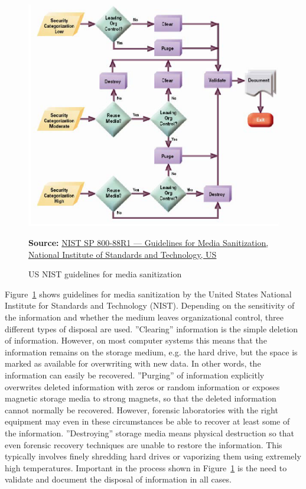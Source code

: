 \begin{figure}
\centering
\includegraphics[width=.75\textwidth]{screen1.png} \\ 

\vspace{\baselineskip}

\tiny \textbf{Source:} \href{https://nvlpubs.nist.gov/nistpubs/SpecialPublications/NIST.SP.800-88r1.pdf}{NIST SP 800-88R1 --- Guidelines for Media Sanitization, National Institute of Standards and Technology, US}
\caption{US NIST guidelines for media sanitization}
\label{fig:nist}
\end{figure}

Figure~\ref{fig:nist} shows guidelines for media sanitization by the United States National Institute for Standards and Technology (NIST). Depending on the sensitivity of the information and whether the medium leaves organizational control, three different types of disposal are used. ''Clearing'' information is the simple deletion of information. However, on most computer systems this means that the information remains on the storage medium, e.g. the hard drive, but the space is marked as available for overwriting with new data. In other words, the information can easily be recovered. ''Purging'' of information explicitly overwrites deleted information with zeros or random information or exposes magnetic storage media to strong magnets, so that the deleted information cannot normally be recovered. However, forensic laboratories with the right equipment may even in these circumstances be able to recover at least some of the information. ''Destroying'' storage media means physical destruction so that even forensic recovery techniques are unable to restore the information. This typically involves finely shredding hard drives or vaporizing them using extremely high temperatures. Important in the process shown in Figure~\ref{fig:nist} is the need to validate and document the disposal of information in all cases. 

